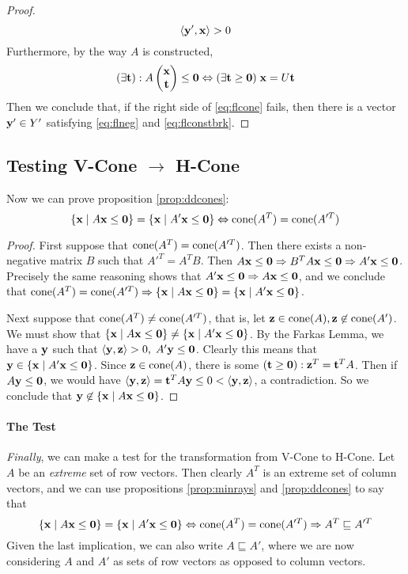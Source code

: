 \begin{proof}
\begin{equation}\label{eq:flconstbrk} \left\langle \mathbf{y}', \mathbf{x} \right\rangle > 0 \end{equation}
Furthermore, by the way $A$ is constructed, 
\begin{equation}\label{eq:flcone}
  (\exists \t) : A \xt \leq \0 \Leftrightarrow (\exists \t\geq\0)\; \x = U\t
\end{equation}
Then we conclude that, if the right side of \eqref{eq:flcone} fails, then there is a vector $\mathbf{y}' \in Y'$ satisfying \eqref{eq:flneg} and \eqref{eq:flconstbrk}.
\end{proof}

\subsection{Testing V-Cone $\to$ H-Cone}

Now we can prove proposition \ref{prop:ddcones}:
  \[ \left\{\mathbf{x}\;|\; A\mathbf{x}\leq\mathbf{0}\right\} = \left\{\mathbf{x}\;|\; A'\mathbf{x}\leq\mathbf{0}\right\} \Leftrightarrow \operatorname{cone}(A^T) = \operatorname{cone}(A'^T) \]
\begin{proof}
First suppose that $\operatorname{cone}(A^T) = \operatorname{cone}(A'^T)$.  Then there exists a non-negative matrix $B$ such that $A'^T = A^TB$.  Then $A\mathbf{x} \leq \mathbf{0} \Rightarrow B^TA\mathbf{x}\leq \mathbf{0} \Rightarrow A'\mathbf{x}\leq\mathbf{0}$.  Precisely the same reasoning shows that $A'\mathbf{x}\leq\mathbf{0} \Rightarrow A\mathbf{x}\leq\mathbf{0}$, and we conclude that $\operatorname{cone}(A^T) = \operatorname{cone}(A'^T) \Rightarrow \left\{\mathbf{x}\;|\; A\mathbf{x}\leq\mathbf{0}\right\} = \left\{\mathbf{x}\;|\; A'\mathbf{x}\leq\mathbf{0}\right\}$.

Next suppose that $\operatorname{cone}(A^T) \neq \operatorname{cone}(A'^T)$, that is, let $\mathbf{z} \in \operatorname{cone}(A), \mathbf{z} \not\in\operatorname{cone}(A')$.  We must show that $\left\{\mathbf{x}\;|\; A\mathbf{x}\leq\mathbf{0}\right\} \neq \left\{\mathbf{x}\;|\; A'\mathbf{x}\leq\mathbf{0}\right\}$.  By the Farkas Lemma, we have a $\mathbf{y}$ such that $\left\langle \mathbf{y}, \mathbf{z} \right\rangle > 0,\; A'\mathbf{y} \leq \mathbf{0}$.  Clearly this means that $\mathbf{y} \in \left\{\mathbf{x}\;|\; A'\mathbf{x}\leq\mathbf{0}\right\}$.  Since $\mathbf{z} \in \operatorname{cone}(A)$, there is some $(\mathbf{t} \geq \mathbf{0}): \mathbf{z}^T = \mathbf{t}^T A$.  Then if $A\mathbf{y}\leq\mathbf{0}$, we would have $\left\langle \mathbf{y}, \mathbf{z} \right\rangle = \mathbf{t}^T A\mathbf{y} \leq 0 < \left\langle \mathbf{y}, \mathbf{z} \right\rangle$, a contradiction.  So we conclude that $\mathbf{y}\not\in\left\{\mathbf{x}\;|\; A\mathbf{x}\leq\mathbf{0}\right\}$.
\end{proof}

\paragraph{The Test}
\textit{Finally}, we can make a test for the transformation from V-Cone to H-Cone.  Let $A$ be an \textit{extreme} set of row vectors.  Then clearly $A^T$ is an extreme set of column vectors, and we can use propositions \ref{prop:minrays} and \ref{prop:ddcones} to say that 
\[ \left\{\mathbf{x}\;|\; A\mathbf{x}\leq\mathbf{0}\right\} = \left\{\mathbf{x}\;|\; A'\mathbf{x}\leq\mathbf{0}\right\} \Leftrightarrow \operatorname{cone}(A^T) = \operatorname{cone}(A'^T) \Rightarrow A^T \sqsubseteq A'^T \]
Given the last implication, we can also write $A \sqsubseteq A'$, where we are now considering $A$ and $A'$ as sets of row vectors as opposed to column vectors.

